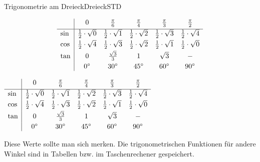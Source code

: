 \begin{MXContent}{Trigonometrie am Dreieck}{Dreieck}{STD}
\ifttm
\begin{MDirectHTML}
\[
\begin{array}[t]{l|*{5}{c}}
              & 0                          & \tfrac{\pi}{6}             & \tfrac{\pi}{4}             & \tfrac{\pi}{3}             & \tfrac{\pi}{2}             \\[1mm] \hline
         \sin & \frac{1}{2} \cdot \sqrt{0} & \frac{1}{2} \cdot \sqrt{1} & \frac{1}{2} \cdot \sqrt{2} & \frac{1}{2} \cdot \sqrt{3} & \frac{1}{2} \cdot \sqrt{4} \\[1mm]
         \cos & \frac{1}{2} \cdot \sqrt{4} & \frac{1}{2} \cdot \sqrt{3} & \frac{1}{2} \cdot \sqrt{2} & \frac{1}{2} \cdot \sqrt{1} & \frac{1}{2} \cdot \sqrt{0} \\[1mm]
         \tan & 0                          & \frac{\sqrt{3}}{3}         & 1                          & \sqrt{3}                   & -                          \\[1mm]
              & 0^{\circ}                  & 30^{\circ}                 & 45^{\circ}                 & 60^{\circ}                 & 90^{\circ}                
\end{array}
\]
\end{MDirectHTML}
\else
\begin{center}
       $\begin{array}[t]{l|*{5}{c}}
              & 0                          & \Mtfrac{\pi}{6}             & \Mtfrac{\pi}{4}             & \Mtfrac{\pi}{3}             & \Mtfrac{\pi}{2}             \\[1mm] \hline
         \sin & \frac{1}{2} \cdot \sqrt{0} & \frac{1}{2} \cdot \sqrt{1} & \frac{1}{2} \cdot \sqrt{2} & \frac{1}{2} \cdot \sqrt{3} & \frac{1}{2} \cdot \sqrt{4} \\[1mm]
         \cos & \frac{1}{2} \cdot \sqrt{4} & \frac{1}{2} \cdot \sqrt{3} & \frac{1}{2} \cdot \sqrt{2} & \frac{1}{2} \cdot \sqrt{1} & \frac{1}{2} \cdot \sqrt{0} \\[1mm]
         \tan & 0                          & \frac{\sqrt{3}}{3}         & 1                          & \sqrt{3}                   & -                          \\[1mm]
              & 0^{\circ}                  & 30^{\circ}                 & 45^{\circ}                 & 60^{\circ}                 & 90^{\circ}                
        \end{array}$
\end{center}
\fi

Diese Werte sollte man sich merken. Die trigonometrischen Funktionen f\"ur andere Winkel sind in Tabellen bzw. im Taschenrechener gespeichert.


\end{MXContent}
